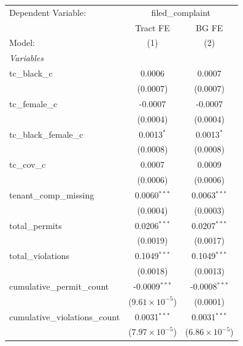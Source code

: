 \begin{tabular}{lcc}
   \tabularnewline \midrule \midrule
   Dependent Variable: & \multicolumn{2}{c}{filed\_complaint}\\
                                   & Tract FE                & BG FE \\   
   Model:                          & (1)                     & (2)\\  
   \midrule
   \emph{Variables}\\
   tc\_black\_c                    & 0.0006                  & 0.0007\\   
                                   & (0.0007)                & (0.0007)\\   
   tc\_female\_c                   & -0.0007                 & -0.0007\\   
                                   & (0.0004)                & (0.0004)\\   
   tc\_black\_female\_c            & 0.0013$^{*}$            & 0.0013$^{*}$\\   
                                   & (0.0008)                & (0.0008)\\   
   tc\_cov\_c                      & 0.0007                  & 0.0009\\   
                                   & (0.0006)                & (0.0006)\\   
   tenant\_comp\_missing           & 0.0060$^{***}$          & 0.0063$^{***}$\\   
                                   & (0.0004)                & (0.0003)\\   
   total\_permits                  & 0.0206$^{***}$          & 0.0207$^{***}$\\   
                                   & (0.0019)                & (0.0017)\\   
   total\_violations               & 0.1049$^{***}$          & 0.1049$^{***}$\\   
                                   & (0.0018)                & (0.0013)\\   
   cumulative\_permit\_count       & -0.0009$^{***}$         & -0.0008$^{***}$\\   
                                   & ($9.61\times 10^{-5}$)  & (0.0001)\\   
   cumulative\_violations\_count   & 0.0031$^{***}$          & 0.0031$^{***}$\\   
                                   & ($7.97\times 10^{-5}$)  & ($6.86\times 10^{-5}$)\\    

\end{tabular}
